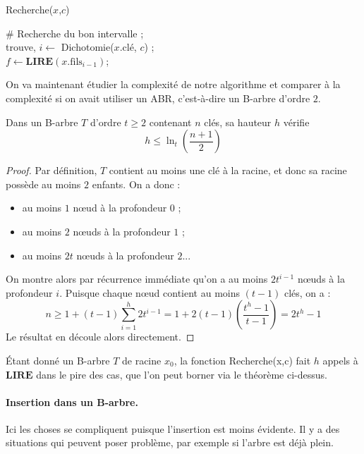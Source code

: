 \begin{algorithm}
\caption{Recherche($x$,$c$)}

\# Recherche du bon intervalle ; \\
trouve, $i \leftarrow$ Dichotomie($x.\text{clé}$, $c$) ;\\
$ f \leftarrow \mathbf{LIRE}(x.\text{fils}_{i-1})$;\\
\end{algorithm}

On va maintenant étudier la complexité de notre algorithme et comparer à la complexité si on avait utiliser un ABR, c'est-à-dire un B-arbre d'ordre $2$.

\begin{theorem}
Dans un B-arbre $T$ d'ordre $t\geq 2$ contenant $n$ clés, sa hauteur $h$ vérifie 
$$
h \leq \ln_t \left( \frac{n+1}{2}\right)
$$
\end{theorem}

\begin{proof}
Par définition, $T$ contient au moins une clé à la racine, et donc sa racine possède au moins $2$ enfants. On a donc :
\begin{itemize}
\item au moins $1$ nœud à la profondeur $0$ ;
\item au moins $2$ nœuds à la profondeur $1$ ;
\item au moins $2t$ nœuds à la profondeur $2$...
\end{itemize}
On montre alors par récurrence immédiate qu'on a au moins $2t^{i-1}$ nœuds à la profondeur $i$. Puisque chaque nœud contient au moins $(t-1)$ clés, on a :
$$
n \geq 1+(t-1) \sum_{i=1}^h 2t^{i-1} = 1 +2(t-1) \left( \frac{t^h -1}{t-1} \right) = 2t^h -1
$$
Le résultat en découle alors directement.
\end{proof}

Étant donné un B-arbre $T$ de racine $x_0$, la fonction Recherche(x,c) fait $h$ appels à $\mathbf{LIRE}$ dans le pire des cas, que l'on peut borner via le théorème ci-dessus.


\paragraph{Insertion dans un B-arbre.} Ici les choses se compliquent puisque l'insertion est moins évidente. Il y a des situations qui peuvent poser problème, par exemple si l'arbre est déjà plein.\newline

